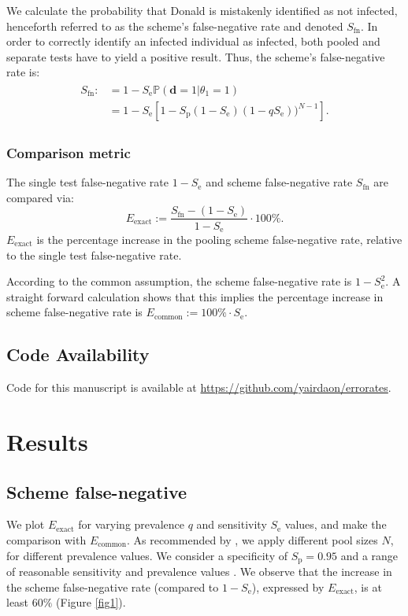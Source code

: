 \documentclass{article}
\newcommand{\Se}{S_\text{e}}
\newcommand{\Sp}{S_\text{p}}
\newcommand{\mi}{S_{\text{fn}}}
\newcommand{\err}[1]{E_{\text{{#1}}}}%
\renewcommand{\Pr}{\mathbb{P}}
\newcommand{\data}{\mathbf{d}}
\begin{document}
We calculate the probability that Donald is mistakenly identified as
not infected, henceforth referred to as the scheme's false-negative
rate and denoted $\mi$. In order to correctly identify an infected
individual as infected, both pooled and separate tests have to yield a
positive result. Thus, the scheme's false-negative rate is:
\begin{align}\label{eq:sfn}
    \begin{split}
        \mi :&= 1 - \Se\Pr(\data=1|\theta_1=1)\\
        &= 1 - \Se\left [1 - \Sp(1-\Se)(1-q\Se))^{N-1}\right].
    \end{split}
\end{align}

\subsubsection*{Comparison metric}
The single test false-negative rate $1-\Se$ and scheme false-negative
rate $\mi$ are compared via:
\begin{equation}\label{eq:erel}
\err{exact} := \frac{\mi - (1-\Se)}{1-\Se} \cdot 100\%.
\end{equation}
$\err{exact}$ is the percentage increase in the pooling scheme
false-negative rate, relative to the single test false-negative rate.

According to the common assumption, the scheme false-negative rate is
$1-\Se^2$. A straight forward calculation shows that this implies the
percentage increase in scheme false-negative rate is $\err{common} :=
100\%\cdot \Se$.

\subsection*{Code Availability}
Code for this manuscript is available at
\url{https://github.com/yairdaon/errorates}.

\section*{Results}\label{section:results}
\subsection*{Scheme false-negative}
We plot $\err{exact}$ for varying prevalence $q$ and sensitivity $\Se$
values, and make the comparison with $\err{common}$. As recommended by
\cite{DorfmanYuvalDor}, we apply different pool sizes $N$, for
different prevalence values. We consider a specificity of $\Sp=0.95$
\cite{DorfmanYuvalDor} and a range of reasonable sensitivity and
prevalence values \cite{KitComparison, InterpretingCOVID19Test,
  EstimatingRatesLourenco, FalsePositiveEstimate}. We observe that the
increase in the scheme false-negative rate (compared to $1-\Se$),
expressed by $\err{exact}$, is at least $60\%$ (Figure \ref{fig1}).
\end{document}
